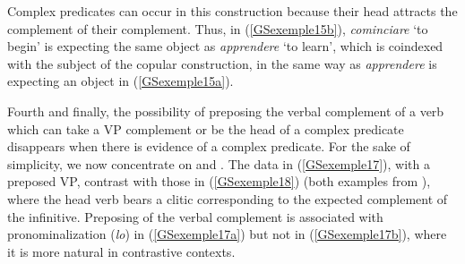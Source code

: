\noindent
Complex predicates can occur in this construction because their head attracts the complement of their complement. Thus, in (\ref{GSexemple15b}), \emph{cominciare} `to begin' is expecting the same object as \emph{apprendere} `to learn', which is coindexed with the\pagebreak{} subject of the copular construction, in the same way as \emph{apprendere} is expecting an object in (\ref{GSexemple15a}). 

\largerpage
Fourth and finally, the possibility of preposing the verbal complement of a verb which can take a VP complement or be the head of a complex predicate disappears when there is evidence of a complex predicate. For the sake of simplicity, we now concentrate on  and . The data in (\ref{GSexemple17}), with a preposed VP, contrast with those in (\ref{GSexemple18}) (both examples from \citealt[132]{AG2010}), where the head verb bears a clitic corresponding to the expected complement of the infinitive. Preposing of the verbal complement is associated with pronominalization (\emph{lo}) in  (\ref{GSexemple17a}) but not in  (\ref{GSexemple17b}), where it is more natural in contrastive contexts.

\begin{exe}
	\label{GSexemple17} 
	\begin{xlist}
	\label{GSexemple17a}
		 
	\label{GSexemple17b}
	\end{xlist}
\end{exe}

\eal
	\label{GSexemple18} 
    \label{GSexemple18a} 	
	
